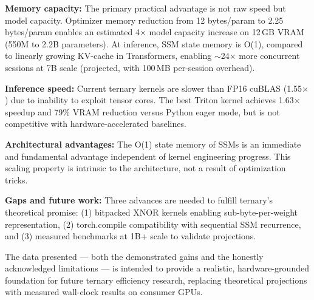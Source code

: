 \documentclass{article}
\begin{document}
\textbf{Memory capacity:} The primary practical advantage is not raw speed but model capacity. Optimizer memory reduction from 12 bytes/param to 2.25 bytes/param enables an estimated 4$\times$ model capacity increase on 12\,GB VRAM (550M to 2.2B parameters). At inference, SSM state memory is O(1), compared to linearly growing KV-cache in Transformers, enabling $\sim$24$\times$ more concurrent sessions at 7B scale (projected, with 100\,MB per-session overhead).

\textbf{Inference speed:} Current ternary kernels are slower than FP16 cuBLAS (1.55$\times$) due to inability to exploit tensor cores. The best Triton kernel achieves 1.63$\times$ speedup and 79\% VRAM reduction versus Python eager mode, but is not competitive with hardware-accelerated baselines.

\textbf{Architectural advantages:} The O(1) state memory of SSMs is an immediate and fundamental advantage independent of kernel engineering progress. This scaling property is intrinsic to the architecture, not a result of optimization tricks.

\textbf{Gaps and future work:} Three advances are needed to fulfill ternary's theoretical promise: (1) bitpacked XNOR kernels enabling sub-byte-per-weight representation, (2) torch.compile compatibility with sequential SSM recurrence, and (3) measured benchmarks at 1B+ scale to validate projections.

The data presented --- both the demonstrated gains and the honestly acknowledged limitations --- is intended to provide a realistic, hardware-grounded foundation for future ternary efficiency research, replacing theoretical projections with measured wall-clock results on consumer GPUs.



\end{document}
